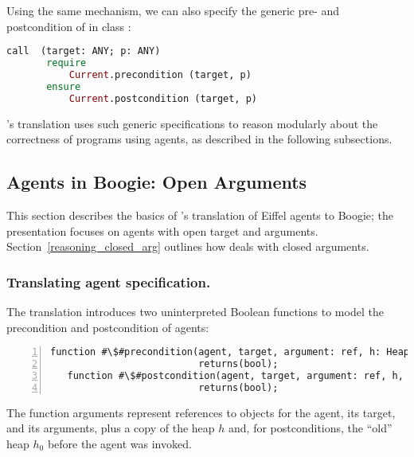 Using the same mechanism, we can also specify the generic pre- and postcondition of  in class :

\begin{lstlisting}[language=Eiffel, escapechar=\#]
     call  (target: ANY; p: ANY)
       require
           Current.precondition (target, p)
       ensure
           Current.postcondition (target, p)
\end{lstlisting}

\AutoProof's translation uses such generic specifications to reason modularly about the correctness of programs using agents, as described in the following subsections. 



\subsection{Agents in Boogie: Open Arguments}\label{reasoning}

This section describes the basics of \AutoProof's translation of Eiffel agents to Boogie; the presentation focuses on agents with open target and arguments.
Section~\ref{reasoning_closed_arg} outlines how \AutoProof deals with closed arguments.



\subsubsection{Translating agent specification.} 

The translation introduces two uninterpreted Boolean functions to model
the precondition and postcondition of agents:
\begin{lstlisting}[escapechar=\#,numbers=left,language=Boogie]
   function #\$#precondition(agent, target, argument: ref, h: HeapType) 
                          returns(bool);
   function #\$#postcondition(agent, target, argument: ref, h, $h_0$: HeapType) 
                          returns(bool);
\end{lstlisting} 
The function arguments represent references to objects for the agent, its target, and its arguments, plus a copy of the heap $h$ and, for postconditions, the ``old'' heap $h_0$ before the agent was invoked.




